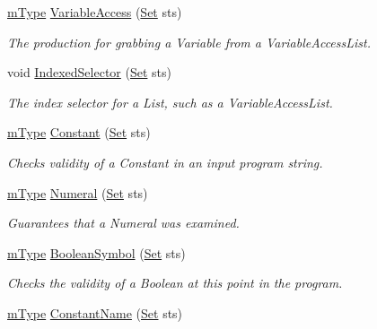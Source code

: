 \begin{DoxyCompactItemize}
\hyperlink{blocktable_8h_a636cfca014f3212ea82d45e28f9cb51b}{mType} \hyperlink{classParser_aef1c7098390f845332d10b95778aee37}{VariableAccess} (\hyperlink{classSet}{Set} sts)
\begin{DoxyCompactList}\small\item\em The production for grabbing a Variable from a VariableAccessList. \item\end{DoxyCompactList}\item 
void \hyperlink{classParser_ae6fd008bc26a87fbfe39d41a7391c01a}{IndexedSelector} (\hyperlink{classSet}{Set} sts)
\begin{DoxyCompactList}\small\item\em The index selector for a List, such as a VariableAccessList. \item\end{DoxyCompactList}\item 
\hyperlink{blocktable_8h_a636cfca014f3212ea82d45e28f9cb51b}{mType} \hyperlink{classParser_af12c5409d708918579a425a44db62fd2}{Constant} (\hyperlink{classSet}{Set} sts)
\begin{DoxyCompactList}\small\item\em Checks validity of a Constant in an input program string. \item\end{DoxyCompactList}\item 
\hyperlink{blocktable_8h_a636cfca014f3212ea82d45e28f9cb51b}{mType} \hyperlink{classParser_afbf7450bc228d82258cf38e8b0733005}{Numeral} (\hyperlink{classSet}{Set} sts)
\begin{DoxyCompactList}\small\item\em Guarantees that a Numeral was examined. \item\end{DoxyCompactList}\item 
\hyperlink{blocktable_8h_a636cfca014f3212ea82d45e28f9cb51b}{mType} \hyperlink{classParser_abe1306c1c2cd82d3d690c42d0aef228f}{BooleanSymbol} (\hyperlink{classSet}{Set} sts)
\begin{DoxyCompactList}\small\item\em Checks the validity of a Boolean at this point in the program. \item\end{DoxyCompactList}\item 
\hyperlink{blocktable_8h_a636cfca014f3212ea82d45e28f9cb51b}{mType} \hyperlink{classParser_abac5f93f9f59866cb683a5414cee14ac}{ConstantName} (\hyperlink{classSet}{Set} sts)

\end{DoxyCompactItemize}
